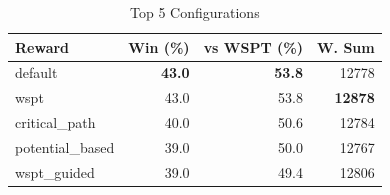 \begin{table}[htbp]%
\centering%
\begin{tabular}{lrrr}%
\toprule%
\textbf{Reward}&\textbf{Win (\%)}&\textbf{vs WSPT (\%)}&\textbf{W. Sum}\\%
\midrule%
default&\textbf{43.0}&\textbf{53.8}&12778\\%
wspt&43.0&53.8&\textbf{12878}\\%
critical_path&40.0&50.6&12784\\%
potential_based&39.0&50.0&12767\\%
wspt_guided&39.0&49.4&12806\\%
\bottomrule%
\end{tabular}%
\caption{Top 5 Configurations}%
\label{tab:summary}%
\end{table}